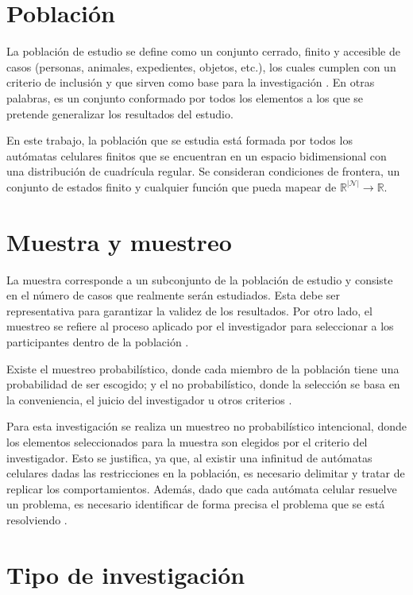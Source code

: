 \section{Población}

La población de estudio se define como un conjunto cerrado, finito y accesible de casos (personas, animales, expedientes, objetos, etc.), los cuales cumplen con un criterio de inclusión y que sirven como base para la investigación \cite{arias2016_poblacion}. En otras palabras, es un conjunto conformado por todos los elementos a los que se pretende generalizar los resultados del estudio.

En este trabajo, la población que se estudia está formada por todos los autómatas celulares finitos que se encuentran en un espacio bidimensional con una distribución de cuadrícula regular. Se consideran condiciones de frontera, un conjunto de estados finito y cualquier función que pueda mapear de $\mathbb{R}^{|\mathcal{N}|} \to \mathbb{R}$.

\section{Muestra y muestreo}

La muestra corresponde a un subconjunto de la población de estudio y consiste en el número de casos que realmente serán estudiados. Esta debe ser representativa para garantizar la validez de los resultados. Por otro lado, el muestreo se refiere al proceso aplicado por el investigador para seleccionar a los participantes dentro de la población \cite{diaz2017_muestra}.

Existe el muestreo probabilístico, donde cada miembro de la población tiene una probabilidad de ser escogido; y el no probabilístico, donde la selección se basa en la conveniencia, el juicio del investigador u otros criterios \cite{diaz2017_muestra}. 

Para esta investigación se realiza un muestreo no probabilístico intencional, donde los elementos seleccionados para la muestra son elegidos por el criterio del investigador. Esto se justifica, ya que, al existir una infinitud de autómatas celulares dadas las restricciones en la población, es necesario delimitar y tratar de replicar los comportamientos. Además, dado que cada autómata celular resuelve un problema, es necesario identificar de forma precisa el problema que se está resolviendo \cite{elsevier2016_computational_biology}.

\section{Tipo de investigación}

